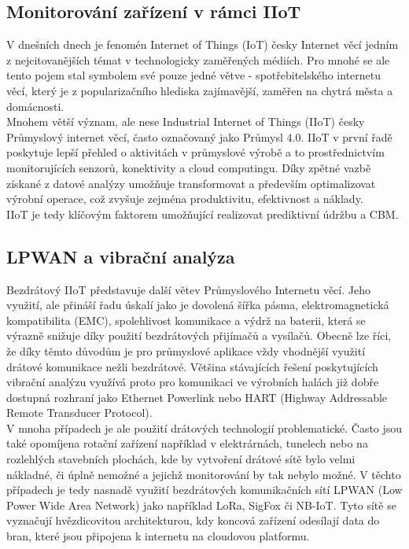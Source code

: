 \subsection{Monitorování zařízení v rámci IIoT}
    V dnešních dnech je fenomén Internet of Things (IoT) česky Internet věcí jedním z nejcitovanějších témat v technologicky zaměřených médiích. Pro mnohé se ale tento pojem stal symbolem své pouze jedné větve - spotřebitelského internetu věcí, který je z popularizačního hlediska zajímavější, zaměřen na chytrá města a domácnosti.\\
    Mnohem větší význam, ale nese Industrial Internet of Things (IIoT) česky Průmyslový internet věcí, často označovaný jako Průmysl 4.0. IIoT v první řadě poskytuje lepší přehled o aktivitách v průmyslové výrobě a to prostřednictvím monitorujících senzorů, konektivity a cloud computingu.
    Díky zpětné vazbě získané z datové analýzy umožňuje transformovat a především optimalizovat výrobní operace, což zvyšuje zejména produktivitu, efektivnost a náklady.\\
    IIoT je tedy klíčovým faktorem umožňující realizovat prediktivní údržbu a CBM.\\
    
    

\subsection{LPWAN a vibrační analýza}
    
    Bezdrátový IIoT představuje další větev Průmyslového Internetu věcí. Jeho využití, ale přináší řadu úskalí jako je dovolená šířka pásma, elektromagnetická kompatibilita (EMC), spolehlivost komunikace a výdrž na baterii, která se výrazně snižuje díky použití bezdrátových přijímačů a vysílačů. Obecně lze říci, že díky těmto důvodům je pro průmyslové aplikace vždy vhodnější využití drátové komunikace nežli bezdrátové. 
    Většina stávajících řešení poskytujících vibrační analýzu využívá proto pro komunikaci ve výrobních halách již dobře dostupná rozhraní jako Ethernet Powerlink nebo HART (Highway Addressable Remote Transducer Protocol).\\
    V mnoha případech je ale použití drátových technologií problematické. Často jsou také opomíjena rotační zařízení například v elektrárnách, tunelech nebo na rozlehlých stavebních plochách, kde by vytvoření drátové sítě bylo velmi nákladné, či úplně nemožné a jejichž monitorování by tak nebylo možné. V těchto případech je tedy nasnadě využití bezdrátových komunikačních sítí LPWAN (Low Power Wide Area Network) jako například LoRa, SigFox či NB-IoT. Tyto sítě se vyznačují hvězdicovitou architekturou, kdy koncová zařízení odesílají data do bran, které jsou připojena k internetu na cloudovou platformu.  

